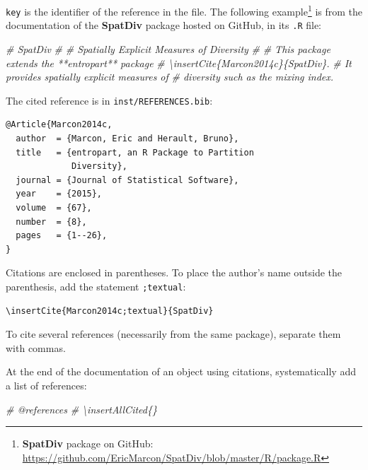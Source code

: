 \documentclass[
  12pt,
  american,
  a4paper,
  extrafontsizes,onecolumn,openright
  ]{memoir}
\newenvironment{Shaded}{\begin{snugshade}}{\end{snugshade}}
\newcommand{\CommentTok}[1]{\textcolor[rgb]{0.56,0.35,0.01}{\textit{#1}}}
\begin{document}
\texttt{key} is the identifier of the reference in the file.
The following example\footnote{\textbf{SpatDiv} package on GitHub: \url{https://github.com/EricMarcon/SpatDiv/blob/master/R/package.R}} is from the documentation of the \textbf{SpatDiv} package hosted on GitHub, in its \texttt{.R} file:

\scriptsize

\begin{Shaded}
\begin{Highlighting}[]
\CommentTok{\#\textquotesingle{} SpatDiv}
\CommentTok{\#\textquotesingle{}}
\CommentTok{\#\textquotesingle{} Spatially Explicit Measures of Diversity}
\CommentTok{\#\textquotesingle{} }
\CommentTok{\#\textquotesingle{} This package extends the **entropart** package}
\CommentTok{\#\textquotesingle{} \textbackslash{}insertCite\{Marcon2014c\}\{SpatDiv\}.}
\CommentTok{\#\textquotesingle{} It provides spatially explicit measures of }
\CommentTok{\#\textquotesingle{} diversity such as the mixing index.}
\end{Highlighting}
\end{Shaded}

\normalsize

The cited reference is in \texttt{inst/REFERENCES.bib}:

\begin{verbatim}
@Article{Marcon2014c,
  author  = {Marcon, Eric and Herault, Bruno},
  title   = {entropart, an R Package to Partition 
             Diversity},
  journal = {Journal of Statistical Software},
  year    = {2015},
  volume  = {67},
  number  = {8},
  pages   = {1--26},
}
\end{verbatim}

Citations are enclosed in parentheses.
To place the author's name outside the parenthesis, add the statement \texttt{;textual}:

\begin{verbatim}
\insertCite{Marcon2014c;textual}{SpatDiv}
\end{verbatim}

To cite several references (necessarily from the same package), separate them with commas.

At the end of the documentation of an object using citations, systematically add a list of references:

\scriptsize

\begin{Shaded}
\begin{Highlighting}[]
\CommentTok{\#\textquotesingle{} @references}
\CommentTok{\#\textquotesingle{} \textbackslash{}insertAllCited\{\}}
\end{Highlighting}
\end{Shaded}
\end{document}
